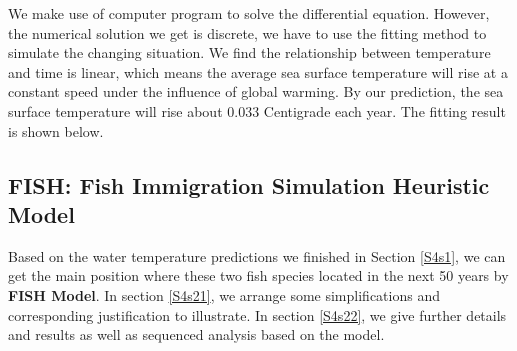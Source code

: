 \documentclass{mcmthesis}
\begin{document}
\par
	We make use of computer program to solve the differential equation. However, the numerical solution we get is discrete, we have to use the fitting method to simulate the changing situation. We find the relationship between temperature and time is linear, which means the average sea surface temperature will rise at a constant speed under the influence of global warming. By our prediction, the sea surface temperature will rise about 0.033 Centigrade each year. The fitting result is shown below.
\par

\subsection{FISH: Fish Immigration Simulation Heuristic Model}\label{S4s2}
	Based on the water temperature predictions we finished in Section \ref{S4s1}, we can get the main position where these two fish species located in the next 50 years by \textbf{FISH Model}. In section \ref{S4s21}, we arrange some simplifications and corresponding justification to illustrate. In section \ref{S4s22}, we give further details and results as well as sequenced analysis based on the model.\par
	
\end{document}
